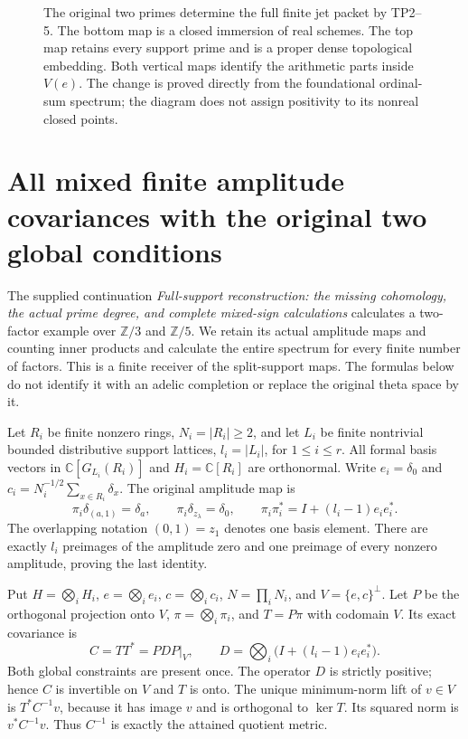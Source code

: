 \documentclass[11pt,a4paper]{article}
\theoremstyle{definition}\newtheorem{definition}[theorem]{Definition}
\newcommand{\Z}{\mathbb Z}\newcommand{\Q}{\mathbb Q}
\newcommand{\C}{\mathbb C}\newcommand{\R}{\mathbb R}
\newcommand{\Spec}{\operatorname{Spec}}\newcommand{\SpecMon}{\operatorname{Spec}_{\mathrm{mon}}}
\newcommand{\SpecLat}{\operatorname{Spec}_{\mathrm{lat}}}
\begin{document}
\begin{figure}[ht]
\centering
{}
\caption{The original two primes determine the full finite jet
packet by TP2--5. The bottom map is a closed immersion of real
schemes. The top map retains every support prime and is a proper
dense topological embedding. Both vertical maps identify the
arithmetic parts inside $V(e)$. The change is proved directly
from the foundational ordinal-sum spectrum; the diagram does not
assign positivity to its nonreal closed points.}
\end{figure}

\section{All mixed finite amplitude covariances with the original two global conditions}
\label{sec:all-mixed-covariances}

The supplied continuation \emph{Full-support reconstruction: the missing
cohomology, the actual prime degree, and complete mixed-sign calculations}
calculates a two-factor example over $\Z/3$ and $\Z/5$. We retain its
actual amplitude maps and counting inner products and calculate the
entire spectrum for every finite number of factors. This is a finite
receiver of the split-support maps. The formulas below do not identify
it with an adelic completion or replace the original theta space by it.

Let $R_i$ be finite nonzero rings, $N_i=|R_i|\ge2$, and let $L_i$ be
finite nontrivial bounded distributive support lattices, $l_i=|L_i|$,
for $1\le i\le r$. All formal basis vectors in $\C[G_{L_i}(R_i)]$
and $H_i=\C[R_i]$ are orthonormal. Write $e_i=\delta_0$ and
$c_i=N_i^{-1/2}\sum_{x\in R_i}\delta_x$. The original amplitude map is
\[
 \pi_i\delta_{(a,1)}=\delta_a,\qquad
 \pi_i\delta_{z_\lambda}=\delta_0,\qquad
 \pi_i\pi_i^*=I+(l_i-1)e_ie_i^*.
 \tag{MG1}\label{mg:amplitude}
\]
The overlapping notation $(0,1)=z_1$ denotes one basis element.
There are exactly $l_i$ preimages of the amplitude zero and one
preimage of every nonzero amplitude, proving the last identity.

Put $H=\bigotimes_iH_i$, $e=\bigotimes_ie_i$, $c=\bigotimes_ic_i$,
$N=\prod_iN_i$, and $V=\{e,c\}^\perp$. Let $P$ be the orthogonal
projection onto $V$, $\pi=\bigotimes_i\pi_i$, and $T=P\pi$ with
codomain $V$. Its exact covariance is
\[
 C=TT^*=PDP|_V,\qquad
 D=\bigotimes_i\bigl(I+(l_i-1)e_ie_i^*\bigr).
 \tag{MG2}\label{mg:covariance}
\]
Both global constraints are present once. The operator $D$ is strictly
positive; hence $C$ is invertible on $V$ and $T$ is onto. The unique
minimum-norm lift of $v\in V$ is $T^*C^{-1}v$, because it has image
$v$ and is orthogonal to $\ker T$. Its squared norm is $v^*C^{-1}v$.
Thus $C^{-1}$ is exactly the attained quotient metric.
\end{document}
